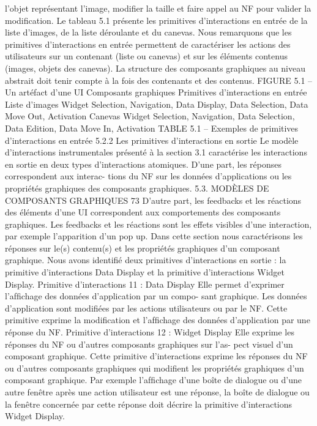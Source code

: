 \documentclass{article}
\begin{document}
l’objet représentant l’image, modiﬁer la taille et faire appel au NF pour valider la modiﬁcation.
Le tableau 5.1 présente les primitives d’interactions en entrée de la liste d’images, de la liste déroulante
et du canevas.
Nous remarquons que les primitives d’interactions en entrée permettent de caractériser les actions
des utilisateurs sur un contenant (liste ou canevas) et sur les éléments contenus (images, objets des
canevas). La structure des composants graphiques au niveau abstrait doit tenir compte à la fois des
contenants et des contenus.
FIGURE 5.1 – Un artéfact d’une UI
Composants
graphiques
Primitives d’interactions en entrée
Liste d’images
Widget Selection, Navigation, Data Display, Data Selection, Data Move Out,
Activation
Canevas
Widget Selection, Navigation, Data Selection, Data Edition, Data Move In,
Activation
TABLE 5.1 – Exemples de primitives d’interactions en entrée
5.2.2
Les primitives d’interactions en sortie
Le modèle d’interactions instrumentales présenté à la section 3.1 caractérise les interactions en
sortie en deux types d’interactions atomiques. D’une part, les réponses correspondent aux interac-
tions du NF sur les données d’applications ou les propriétés graphiques des composants graphiques.
5.3. MODÈLES DE COMPOSANTS GRAPHIQUES
73
D’autre part, les feedbacks et les réactions des éléments d’une UI correspondent aux comportements
des composants graphiques. Les feedbacks et les réactions sont les effets visibles d’une interaction,
par exemple l’apparition d’un pop up.
Dans cette section nous caractérisons les réponses sur le(s) contenu(s) et les propriétés graphiques
d’un composant graphique. Nous avons identiﬁé deux primitives d’interactions en sortie : la primitive
d’interactions Data Display et la primitive d’interactions Widget Display.
Primitive d’interactions 11 : Data Display
Elle permet d’exprimer l’afﬁchage des données d’application par un compo-
sant graphique.
Les données d’application sont modiﬁées par les actions utilisateurs ou par le NF. Cette primitive
exprime la modiﬁcation et l’afﬁchage des données d’application par une réponse du NF.
Primitive d’interactions 12 : Widget Display
Elle exprime les réponses du NF ou d’autres composants graphiques sur l’as-
pect visuel d’un composant graphique.
Cette primitive d’interactions exprime les réponses du NF ou d’autres composants graphiques qui
modiﬁent les propriétés graphiques d’un composant graphique. Par exemple l’afﬁchage d’une boîte
de dialogue ou d’une autre fenêtre après une action utilisateur est une réponse, la boîte de dialogue ou
la fenêtre concernée par cette réponse doit décrire la primitive d’interactions Widget Display.
\end{document}

